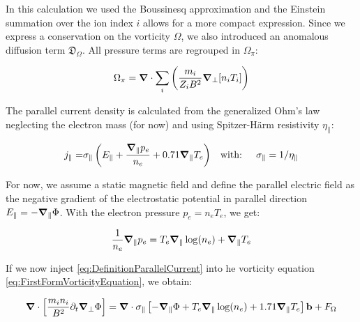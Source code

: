 In this calculation we used the Boussinesq approximation and the Einstein summation over the ion index $i$ allows for a more compact expression. Since we express a conservation on the vorticity $\Omega$, we also introduced an anomalous diffusion term $\mathfrak{D}_\Omega$. All pressure terms are regrouped in $\Omega_\pi$:

\begin{equation}
	\Omega_\pi = \grad\cdot\sum_{i}\left(\frac{m_i}{Z_i B^2}\grad_\perp[n_i T_i]\right)
\end{equation}


The parallel current density is calculated from the generalized Ohm's law neglecting the electron mass (for now) and using Spitzer-Härm resistivity $\eta_\parallel$:
 
\begin{align} 
 	\label{eq:DefinitionParallelCurrent}
 	j_\parallel =& \sigma_\parallel \left(E_\parallel + \frac{\grad_\parallel p_e}{n_e} + 0.71\grad_\parallel T_e\right) & \text{with: }&& \sigma_\parallel = 1/\eta_\parallel
 \end{align}

For now, we assume a static magnetic field and define the parallel electric field as the negative gradient of the electrostatic potential in parallel direction $E_\parallel=-\grad_\parallel\Phi$. With the electron pressure $p_e=n_eT_e$, we get:  
 
$$\frac{1}{n_e}\grad_\parallel p_e = T_e\grad_\parallel\log(n_e) + \grad_\parallel T_e$$

If we now inject \autoref{eq:DefinitionParallelCurrent} into he vorticity equation \autoref{eq:FirstFormVorticityEquation}, we obtain: 
 
\begin{equation}
	\label{eq:ElectrostaticVorticityEquation}
	 \grad\cdot\left[\frac{m_i n_i}{ B^2}\partial_t\grad_\perp\Phi\right]  = \grad\cdot\sigma_\parallel \left[-\grad_\parallel\Phi +  T_e\grad_\parallel\log(n_e) + 1.71\grad_\parallel T_e\right]\mathbf{b} + F_\Omega
\end{equation}

